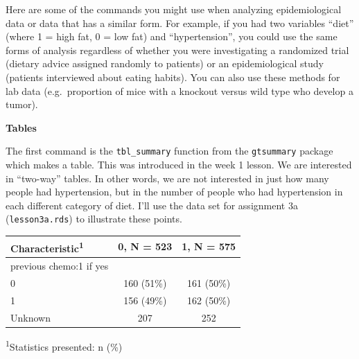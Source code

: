 \documentclass[]{book}
\newenvironment{Shaded}{\begin{snugshade}}{\end{snugshade}}
\newcommand{\DataTypeTok}[1]{\textcolor[rgb]{0.13,0.29,0.53}{#1}}
\newcommand{\KeywordTok}[1]{\textcolor[rgb]{0.13,0.29,0.53}{\textbf{#1}}}
\newcommand{\NormalTok}[1]{#1}
\newcommand{\OperatorTok}[1]{\textcolor[rgb]{0.81,0.36,0.00}{\textbf{#1}}}
\newcommand{\StringTok}[1]{\textcolor[rgb]{0.31,0.60,0.02}{#1}}
\begin{document}
Here are some of the commands you might use when analyzing epidemiological data or data that has a similar form. For example, if you had two variables ``diet'' (where 1 = high fat, 0 = low fat) and ``hypertension'', you could use the same forms of analysis regardless of whether you were investigating a randomized trial (dietary advice assigned randomly to patients) or an epidemiological study (patients interviewed about eating habits). You can also use these methods for lab data (e.g.~proportion of mice with a knockout versus wild type who develop a tumor).

\textbf{Tables}

The first command is the \texttt{tbl\_summary} function from the \texttt{gtsummary} package which makes a table. This was introduced in the week 1 lesson. We are interested in ``two-way'' tables. In other words, we are not interested in just how many people had hypertension, but in the number of people who had hypertension in each different category of diet. I'll use the data set for assignment 3a (\texttt{lesson3a.rds}) to illustrate these points.

\begin{Shaded}
\end{Shaded}

\captionsetup[table]{labelformat=empty,skip=1pt}
\begin{longtable}{lcc}
\toprule
\textbf{Characteristic}\textsuperscript{1} & \textbf{0}, N = 523 & \textbf{1}, N = 575 \\ 
\midrule
previous chemo:1 if yes &  &  \\ 
0 & 160 (51\%) & 161 (50\%) \\ 
1 & 156 (49\%) & 162 (50\%) \\ 
Unknown & 207 & 252 \\ 
\bottomrule
\end{longtable}
\vspace{-5mm}
\begin{minipage}{\linewidth}
\textsuperscript{1}Statistics presented: n (\%) \\ 
\end{minipage}
\end{document}
